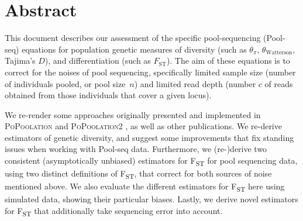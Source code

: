 \documentclass[letterpaper,fontsize=9pt,DIV=12]{scrartcl}
\newcommand\toolname{\textsc}
\newcommand{\samplesize}{n}
\newcommand{\readdepth}{c}
\newcommand{\fst}{F\textsubscript{ST}}
\newcommand{\mathfst}{F_\text{ST}}
\begin{document}

\vspace*{2em}
\setlength{\fboxsep}{2em}
\vspace*{2em}

\section*{Abstract}
\label{supp:sec:Abstract}

This document describes our assessment of the specific pool-sequencing (Pool-seq) equations for population genetic measures of diversity (such as $\theta_\pi$, $\theta_\text{Watterson}$, Tajima's $D$), and differentiation (such as $\mathfst$).
The aim of these equations is to correct for the noises of pool sequencing, specifically limited sample size (number of individuals pooled, or pool size~$\samplesize$) and limited read depth (number $\readdepth$ of reads obtained from those individuals that cover a given locus).

We re-render some approaches originally presented and implemented in \toolname{PoPoolation} \cite{Kofler2011a} and \toolname{PoPoolation2} \cite{Kofler2011b}, as well as other publications.  We re-derive estimators of genetic diversity, and suggest some improvements that fix standing issues when working with Pool-seq data. Furthermore, we (re-)derive two consistent (asymptotically unbiased) estimators for \fst{} for pool sequencing data, using two distinct definitions of \fst{}, that correct for both sources of noise mentioned above.  We also evaluate the different estimators for \fst{} here using simulated data, showing their particular biases.  Lastly, we derive novel estimators for \fst{} that additionally take sequencing error into account.  
\end{document}
